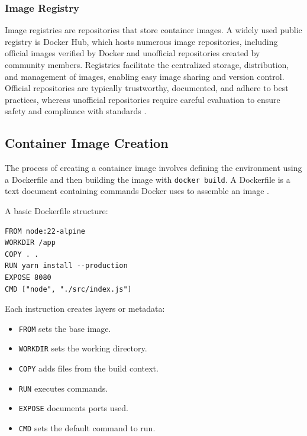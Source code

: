 \subsubsection{Image Registry}
Image registries are repositories that store container images.
A widely used public registry is Docker Hub, which hosts numerous image repositories, including official images verified by Docker and unofficial repositories created by community members.
Registries facilitate the centralized storage, distribution, and management of images, enabling easy image sharing and version control.
Official repositories are typically trustworthy, documented, and adhere to best practices, whereas unofficial repositories require careful evaluation to ensure safety and compliance with standards \citep{poultonDockerDeepDive2019}.

\subsection{Container Image Creation}
The process of creating a container image involves defining the environment using a Dockerfile and then building the image with \texttt{docker build}.
A Dockerfile is a text document containing commands Docker uses to assemble an image \citep{dockerDockerReferenceDocumentation2025}.

A basic Dockerfile structure:
\begin{lstlisting}[caption=Dockerfile example (adapted from \cite{dockerDockerReferenceDocumentation2025})]
FROM node:22-alpine
WORKDIR /app
COPY . .
RUN yarn install --production
EXPOSE 8080
CMD ["node", "./src/index.js"]
\end{lstlisting}
Each instruction creates layers or metadata:
\begin{itemize}
    \item \texttt{FROM} sets the base image.
    \item \texttt{WORKDIR} sets the working directory.
    \item \texttt{COPY} adds files from the build context.
    \item \texttt{RUN} executes commands.
    \item \texttt{EXPOSE} documents ports used.
    \item \texttt{CMD} sets the default command to run.
\end{itemize}

